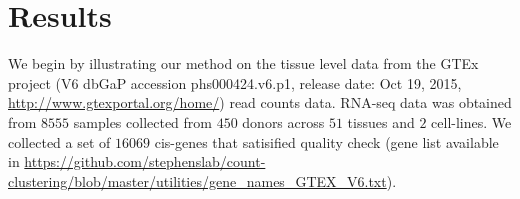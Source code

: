 \section{Results}

%
%
%
%
%
%
%
%
%
%
%

We begin by illustrating our method on the tissue level data from the  GTEx project (V6 dbGaP accession phs000424.v6.p1, release date: Oct 19, 2015, \url{http://www.gtexportal.org/home/}) read counts data.  RNA-seq data was obtained from $8555$ samples collected from $450$ donors across $51$ tissues and $2$ cell-lines. We collected a set of $16069$ cis-genes that satisified quality check (gene list available in \url{https://github.com/stephenslab/count-clustering/blob/master/utilities/gene_names_GTEX_V6.txt}).  \\[1 pt]


